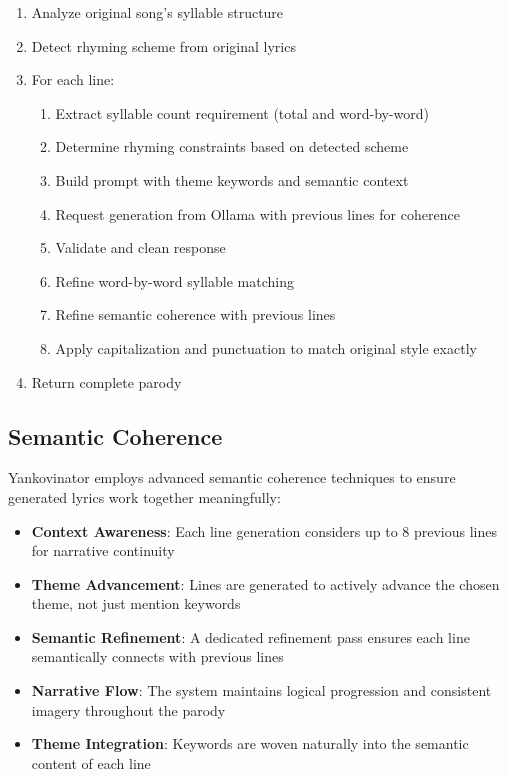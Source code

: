 \documentclass[11pt,a4paper]{article}
\begin{document}
\begin{enumerate}
    \item Analyze original song's syllable structure
    \item Detect rhyming scheme from original lyrics
    \item For each line:
        \begin{enumerate}
            \item Extract syllable count requirement (total and word-by-word)
            \item Determine rhyming constraints based on detected scheme
            \item Build prompt with theme keywords and semantic context
            \item Request generation from Ollama with previous lines for coherence
            \item Validate and clean response
            \item Refine word-by-word syllable matching
            \item Refine semantic coherence with previous lines
            \item Apply capitalization and punctuation to match original style exactly
        \end{enumerate}
    \item Return complete parody
\end{enumerate}

\subsection{Semantic Coherence}

Yankovinator employs advanced semantic coherence techniques to ensure generated lyrics work together meaningfully:

\begin{itemize}
    \item \textbf{Context Awareness}: Each line generation considers up to 8 previous lines for narrative continuity
    \item \textbf{Theme Advancement}: Lines are generated to actively advance the chosen theme, not just mention keywords
    \item \textbf{Semantic Refinement}: A dedicated refinement pass ensures each line semantically connects with previous lines
    \item \textbf{Narrative Flow}: The system maintains logical progression and consistent imagery throughout the parody
    \item \textbf{Theme Integration}: Keywords are woven naturally into the semantic content of each line
\end{itemize}
\end{document}
